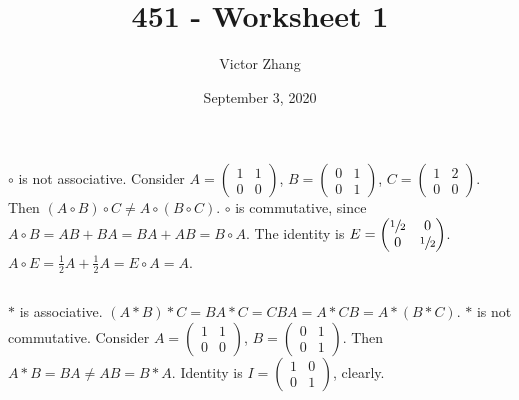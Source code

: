 \documentclass{article}
\title{451 - Worksheet 1}
\author{Victor Zhang}
\date{September 3, 2020}
\begin{document}
\maketitle

\section{}
\subsection{}
$\circ$ is not associative. Consider $A = \left( \begin{matrix} 1 & 1 \\ 0 & 0 \end{matrix} \right)$, $B = \left( \begin{matrix} 0 & 1 \\ 0 & 1 \end{matrix} \right)$, $C = \left( \begin{matrix} 1 & 2 \\ 0 & 0 \end{matrix} \right)$. Then $(A\circ B) \circ C \neq A\circ (B \circ C)$. $\circ$ is commutative, since $A \circ B = AB+BA = BA+AB = B \circ A$. The identity is $E = \left( \begin{matrix} \sfrac{1}{2} & 0 \\ 0 & \sfrac{1}{2} \end{matrix} \right)$. $A \circ E = \frac{1}{2}A + \frac{1}{2}A = E \circ A = A$.

\subsection{}
$*$ is associative. $(A*B)*C = BA*C = CBA = A*CB = A*(B*C)$. $*$ is not commutative. Consider $A = \left( \begin{matrix} 1 & 1 \\ 0 & 0 \end{matrix} \right)$, $B = \left( \begin{matrix} 0 & 1 \\ 0 & 1 \end{matrix} \right)$. Then $A*B = BA \neq AB = B*A$. Identity is $I = \left( \begin{matrix} 1 & 0 \\ 0 & 1 \end{matrix} \right)$, clearly.
\end{document}
